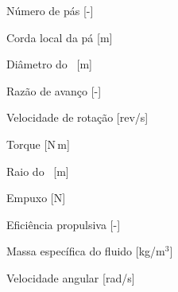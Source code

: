 \begin{simbolos}
    \item[$B$] Número de pás [-]
    \item[$c$] Corda local da pá [m]
    \item[$D$] Diâmetro do \propeller\ [m]
    \item[$J$] Razão de avanço [-]
    \item[$n$] Velocidade de rotação [rev/s]
    \item[$Q$] Torque [N\,m]
    \item[$R$] Raio do \propeller\ [m]
    \item[$T$] Empuxo [N]
    \item[$\eta$] Eficiência propulsiva [-]
    \item[$\rho$] Massa específica do fluido [kg/m$^3$]
    \item[$\Omega$] Velocidade angular [rad/s]
\end{simbolos}
